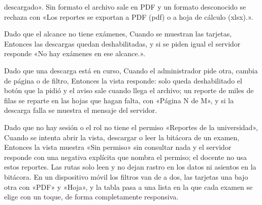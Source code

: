 {      descargado». Sin formato el archivo sale en PDF y un formato desconocido se
      rechaza con «Los reportes se exportan a PDF (pdf) o a hoja de cálculo (xlsx).».
\item Dado que el alcance no tiene exámenes, Cuando se muestran las tarjetas, Entonces
      las descargas quedan deshabilitadas, y si se piden igual el servidor responde «No
      hay exámenes en ese alcance.».
\item Dado que una descarga está en curso, Cuando el administrador pide otra, cambia de
      página o de filtro, Entonces la vista responde: solo queda deshabilitado el botón
      que la pidió y el aviso sale cuando llega el archivo; un reporte de miles de filas
      se reparte en las hojas que hagan falta, con «Página N de M», y si la descarga
      falla se muestra el mensaje del servidor.
\item Dado que no hay sesión o el rol no tiene el permiso «Reportes de la universidad»,
      Cuando se intenta abrir la vista, descargar o leer la bitácora de un examen,
      Entonces la vista muestra «Sin permiso» sin consultar nada y el servidor responde
      con una negativa explícita que nombra el permiso; el docente no usa estos
      reportes. Las rutas solo leen y no dejan rastro en los datos ni asientos en la
      bitácora. En un dispositivo móvil los filtros van de a dos, las tarjetas una bajo
      otra con «PDF» y «Hoja», y la tabla pasa a una lista en la que cada examen se
      elige con un toque, de forma completamente responsiva.}



